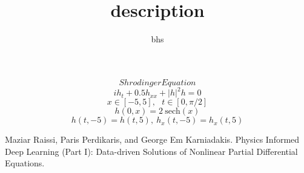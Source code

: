 \documentclass[12pt]{amsart}
\title{description}
\author{bhs}
\begin{document}
\maketitle
$$Shrodinger Equation$$
$$ i h_t + 0.5 h_{xx} + |h|^2 h = 0$$
$$x \in [-5, 5],\ \ \ t \in [0, \pi/2]$$
$$h(0,x) = 2\ \text{sech}(x)$$
$$h(t,-5) = h(t, 5),\ h_x(t,-5) = h_x(t, 5)$$


\begin{thebibliography}{10}
 Maziar Raissi, Paris Perdikaris, and George Em Karniadakis. Physics Informed Deep Learning (Part I): Data-driven Solutions of Nonlinear Partial Differential Equations.
\end{thebibliography}
\end{document}
